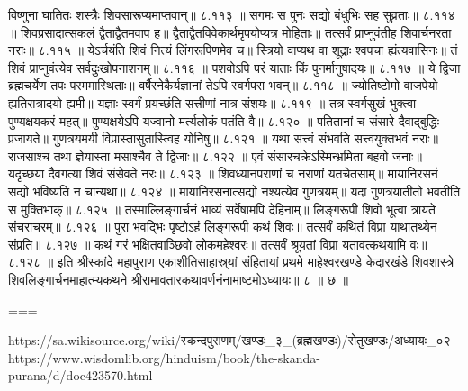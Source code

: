 विष्णुना घातितः शस्त्रैः शिवसारूप्यमाप्तवान्॥ ८.११३ ॥
सगमः स पुनः सद्यो बंधुभिः सह सुव्रताः॥ ८.११४ ॥
शिवप्रसादात्सकलं द्वैताद्वैतमवाप ह॥
द्वैताद्वैतविवेकार्थमृपयोप्यत्र मोहिताः॥
तत्सर्वं प्राप्नुवंतीह शिवार्चनरता नराः॥ ८.११५ ॥
येऽर्चयंति शिवं नित्यं लिंगरूपिणमेव च॥
स्त्रियो वाप्यथ वा शूद्राः श्वपचा ह्यंत्यवासिनः॥
तं शिवं प्राप्नुवंत्येव सर्वदुःखोपनाशनम्॥ ८.११६ ॥
पशवोऽपि परं याताः किं पुनर्मानुषादयः॥ ८.११७ ॥
ये द्विजा ब्रह्मचर्येण तपः परममास्थिताः॥
वर्षैरनेकैर्यज्ञानां तेऽपि स्वर्गपरा भवन्॥ ८.११८ ॥
ज्योतिष्टोमो वाजपेयो ह्यतिरात्रादयो ह्यमी॥
यज्ञाः स्वर्गं प्रयच्छंति सत्त्रीणां नात्र संशयः॥ ८.११९ ॥
तत्र स्वर्गसुखं भुक्त्वा पुण्यक्षयकरं महत्॥
पुण्यक्षयेऽपि यज्वानो मर्त्यलोकं पतंति वै॥ ८.१२० ॥
पतितानां च संसारे दैवाद्बुद्धिः प्रजायते॥
गुणत्रयमयी विप्रास्तासुतास्त्विह योनिषु॥ ८.१२१ ॥
यथा सत्त्वं संभवति सत्त्वयुक्तभवं नराः॥
राजसाश्च तथा ज्ञेयास्ता मसाश्चैव ते द्विजाः॥ ८.१२२ ॥
एवं संसारचक्रेऽस्मिन्भ्रमिता बहवो जनाः॥
यदृच्छया दैवगत्या शिवं संसेवते नरः॥ ८.१२३ ॥
शिवध्यानपराणां च नराणां यतचेतसाम्॥
मायानिरसनं सद्यो भविष्यति न चान्यथा॥ ८.१२४ ॥
मायानिरसनात्सद्यो नश्यत्येव गुणत्रयम्॥
यदा गुणत्रयातीतो भवतीति स मुक्तिभाक्॥ ८.१२५ ॥
तस्माल्लिङ्गार्चनं भाव्यं सर्वेषामपि देहिनाम्॥
लिङ्गरूपी शिवो भूत्वा त्रायते संचराचरम्॥ ८.१२६ ॥
पुरा भवद्भिः पृष्टोऽहं लिङ्गरूपी कथं शिवः॥
तत्सर्वं कथितं विप्रा याथातथ्येन संप्रति॥ ८.१२७ ॥
कथं गरं भक्षितवाञ्छिवो लोकमहेश्वरः॥
तत्सर्वं श्रूयतां विप्रा यतावत्कथयामि वः॥ ८.१२८ ॥
इति श्रीस्कांदे महापुराण एकाशीतिसाहास्र्यां संहितायां प्रथमे माहेश्वरखण्डे केदारखंडे शिवशास्त्रे शिवलिङ्गार्चनमाहात्म्यकथने श्रीरामावतारकथावर्णनंनामाष्टमोऽध्यायः॥ ८ ॥ छ ॥


===

https://sa.wikisource.org/wiki/स्कन्दपुराणम्/खण्डः_३_(ब्रह्मखण्डः)/सेतुखण्डः/अध्यायः_०२
https://www.wisdomlib.org/hinduism/book/the-skanda-purana/d/doc423570.html

